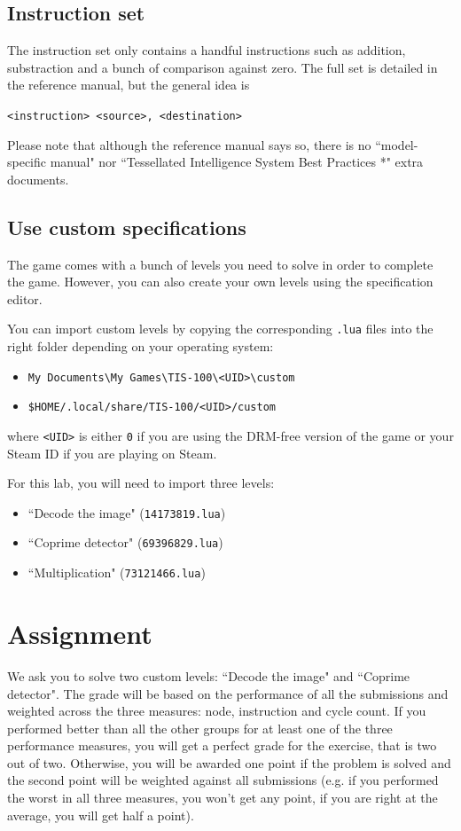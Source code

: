 \documentclass[10pt,a4paper]{article}
\theoremstyle{definition}%
\begin{document}
\subsection{Instruction set}
The instruction set only contains a handful instructions such as addition, substraction and a bunch of comparison against zero.
The full set is detailed in the reference manual, but the general idea is
\begin{center}
	\verb!<instruction> <source>, <destination>!
\end{center}

Please note that although the reference manual says so, there is no ``model-specific manual" nor ``Tessellated Intelligence System Best Practices *" extra documents.

\subsection{Use custom specifications}
The game comes with a bunch of levels you need to solve in order to complete the game.
However, you can also create your own levels using the specification editor.

You can import custom levels by copying the corresponding \texttt{.lua} files into the right folder depending on your operating system:
\begin{itemize}
	\item[\faWindows] \verb|My Documents\My Games\TIS-100\<UID>\custom|
	\item[\faLinux] \verb|$HOME/.local/share/TIS-100/<UID>/custom|
\end{itemize}
where \texttt{<UID>} is either \texttt{0} if you are using the DRM-free version of the game or your Steam ID if you are playing on Steam.

For this lab, you will need to import three levels:
\begin{itemize}
	\item ``Decode the image" (\texttt{14173819.lua})
	\item ``Coprime detector" (\texttt{69396829.lua})
	\item ``Multiplication" (\texttt{73121466.lua})
\end{itemize}




\section{Assignment}
We ask you to solve two custom levels: ``Decode the image" and ``Coprime detector".
The grade will be based on the performance of all the submissions and weighted across the three measures: node, instruction and cycle count.
If you performed better than all the other groups for at least one of the three performance measures, you will get a perfect grade for the exercise, that is two out of two.
Otherwise, you will be awarded one point if the problem is solved and the second point will be weighted against all submissions (e.g. if you performed the worst in all three measures, you won't get any point, if you are right at the average, you will get half a point).
\end{document}
